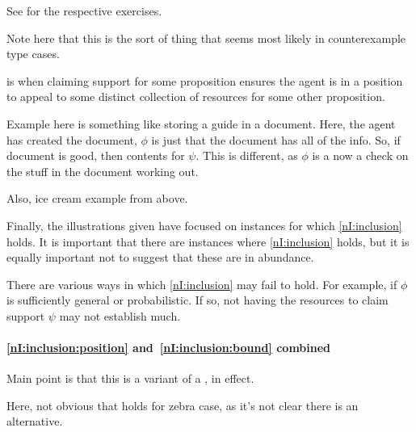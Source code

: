 \begin{note}[Inclusion]
{    See \textcite[210]{Blackburn:2002aa} for the respective exercises.
  }

  {
    \color{red}
    Note here that this is the sort of thing that seems most likely in counterexample type cases.
  }
\end{note}

\begin{note}[\asso{}]
  \asso{} is when claiming support for some proposition ensures the agent is in a position to appeal to some distinct collection of resources for some other proposition.

  \begin{illustration}
    Example here is something like storing a guide in a document.
    Here, the agent has created the document, \(\phi\) is just that the document has all of the info.
    So, if document is good, then contents for \(\psi\).
    This is different, as \(\phi\) is a now a check on the stuff in the document working out.
  \end{illustration}

  Also, ice cream example from above.
\end{note}

\begin{note}
  Finally, the illustrations given have focused on instances for which \ref{nI:inclusion} holds.
  It is important that there are instances where \ref{nI:inclusion} holds, but it is equally important not to suggest that these are in abundance.
\end{note}

\begin{note}
  There are various ways in which \ref{nI:inclusion} may fail to hold.
  For example, if \(\phi\) is sufficiently general or probabilistic.
  If so, not having the resources to claim support \(\psi\) may not establish much.
\end{note}

\paragraph{\ref{nI:inclusion:position} and~\ref{nI:inclusion:bound} combined}

\begin{note}
  {\color{red}
    Main point is that this is a variant of a \requ{}, in effect.
  }
\end{note}

\begin{note}
  Here, not obvious that holds for zebra case, as it's not clear there is an alternative.
\end{note}

